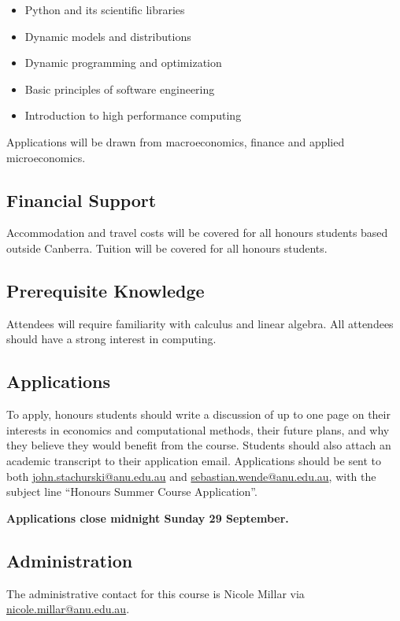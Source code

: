 \documentclass[12pt]{article}
\numberwithin{equation}{section}		%
\numberwithin{table}{section}				%
\begin{document}
\begin{itemize}
    \item Python and its scientific libraries
    \item Dynamic models and distributions
    \item Dynamic programming and optimization
    \item Basic principles of software engineering
    \item Introduction to high performance computing
\end{itemize}

Applications will be drawn from macroeconomics, finance and applied
microeconomics.

\subsection*{Financial Support}

Accommodation and travel costs will be covered for all honours students based 
outside Canberra.  Tuition will be covered for all honours students.

\subsection*{Prerequisite Knowledge}

Attendees will require familiarity with calculus and linear algebra.
All attendees should have a strong interest in computing.

\subsection*{Applications}

To apply, honours students should write a discussion of up to one page on
their interests in economics and computational methods, their future plans,
and why they
believe they would benefit from the course.    Students should also attach an
academic transcript to their application email.  Applications should be sent
to both \href{mailto:john.stachurski@anu.edu.au}{john.stachurski@anu.edu.au} and
\href{mailto:sebastian.wende@anu.edu.au}{sebastian.wende@anu.edu.au}, with the
subject line ``Honours Summer Course Application''.

\textbf{Applications close midnight Sunday 29 September.}

\subsection*{Administration}

The administrative contact for this course is Nicole Millar via \href{mailto:nicole.millar@anu.edu.au}{nicole.millar@anu.edu.au}.




\end{document}
